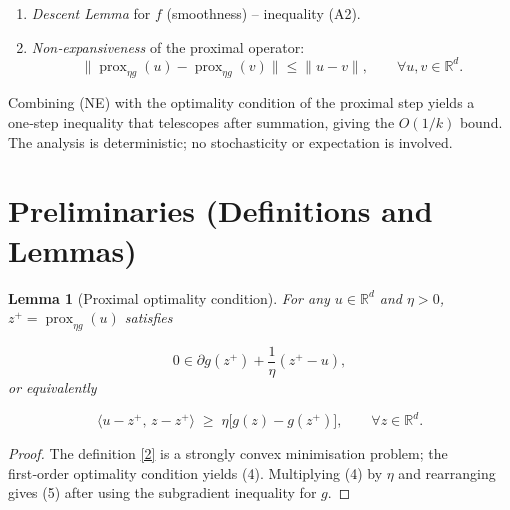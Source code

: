 \documentclass{article}
\newtheorem{lemma}{Lemma}
\newcommand{\prox}{\operatorname{prox}}
\newcommand{\R}{\mathbb{R}}
\begin{document}
\begin{enumerate}[label=\arabic*.]
  \item \emph{Descent Lemma} for $f$ (smoothness) – inequality (A2).
  \item \emph{Non‑expansiveness} of the proximal operator:
        \[
        \|\prox_{\eta g}(u)-\prox_{\eta g}(v)\|
        \le \|u-v\|,\qquad\forall u,v\in\R^{d}.
        \tag{NE}
        \]
\end{enumerate}
Combining (NE) with the optimality condition of the proximal step yields a
one‑step inequality that telescopes after summation, giving the $O(1/k)$ bound.
The analysis is deterministic; no stochasticity or expectation is involved.

\newpage
\section*{Preliminaries (Definitions and Lemmas)}
\begin{lemma}[Proximal optimality condition]\label{lem:prox-opt}
For any $u\in\R^{d}$ and $\eta>0$, $z^{+}= \prox_{\eta g}(u)$ satisfies  

\[
0\in \partial g(z^{+})+\frac{1}{\eta}(z^{+}-u),
\tag{4}
\]
or equivalently  

\[
\langle u-z^{+},\,z-z^{+}\rangle\;\ge\;\eta\bigl[g(z)-g(z^{+})\bigr],
\qquad\forall z\in\R^{d}.
\tag{5}
\]
\end{lemma}
\begin{proof}
The definition \eqref{2} is a strongly convex minimisation problem; the
first‑order optimality condition yields (4). Multiplying (4) by $\eta$ and
rearranging gives (5) after using the subgradient inequality for $g$.
\end{proof}
\end{document}
